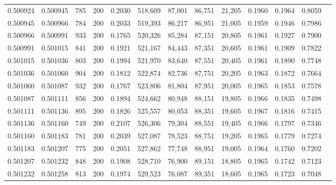 \begin{tabular}{rrrrrrrrrrrrr}
0.500924 & 0.500945 &   785 & 200 &                                     0.2030 & 518,609 &  87,001 &  86,751 &  21,205 & 0.1960 & 0.1964 & 0.8059 \\
0.500945 & 0.500966 &   784 & 200 &                                     0.2033 & 519,393 &  86,217 &  86,951 &  21,005 & 0.1959 & 0.1946 & 0.7986 \\
0.500966 & 0.500991 &   933 & 200 &                                     0.1765 & 520,326 &  85,284 &  87,151 &  20,805 & 0.1961 & 0.1927 & 0.7900 \\
0.500991 & 0.501015 &   841 & 200 &                                     0.1921 & 521,167 &  84,443 &  87,351 &  20,605 & 0.1961 & 0.1909 & 0.7822 \\
0.501015 & 0.501036 &   803 & 200 &                                     0.1994 & 521,970 &  83,640 &  87,551 &  20,405 & 0.1961 & 0.1890 & 0.7748 \\
0.501036 & 0.501060 &   904 & 200 &                                     0.1812 & 522,874 &  82,736 &  87,751 &  20,205 & 0.1963 & 0.1872 & 0.7664 \\
0.501060 & 0.501087 &   932 & 200 &                                     0.1767 & 523,806 &  81,804 &  87,951 &  20,005 & 0.1965 & 0.1853 & 0.7578 \\
0.501087 & 0.501111 &   856 & 200 &                                     0.1894 & 524,662 &  80,948 &  88,151 &  19,805 & 0.1966 & 0.1835 & 0.7498 \\
0.501111 & 0.501136 &   895 & 200 &                                     0.1826 & 525,557 &  80,053 &  88,351 &  19,605 & 0.1967 & 0.1816 & 0.7415 \\
0.501136 & 0.501160 &   749 & 200 &                                     0.2107 & 526,306 &  79,304 &  88,551 &  19,405 & 0.1966 & 0.1797 & 0.7346 \\
0.501160 & 0.501183 &   781 & 200 &                                     0.2039 & 527,087 &  78,523 &  88,751 &  19,205 & 0.1965 & 0.1779 & 0.7274 \\
0.501183 & 0.501207 &   775 & 200 &                                     0.2051 & 527,862 &  77,748 &  88,951 &  19,005 & 0.1964 & 0.1760 & 0.7202 \\
0.501207 & 0.501232 &   848 & 200 &                                     0.1908 & 528,710 &  76,900 &  89,151 &  18,805 & 0.1965 & 0.1742 & 0.7123 \\
0.501232 & 0.501258 &   813 & 200 &                                     0.1974 & 529,523 &  76,087 &  89,351 &  18,605 & 0.1965 & 0.1723 & 0.7048 \\

\end{tabular}
